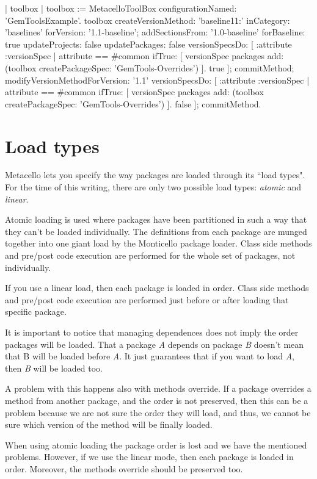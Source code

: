 \documentclass[a4paper,10pt,twoside]{book}
\begin{document}
\begin{code}{}
| toolbox |
toolbox := MetacelloToolBox configurationNamed: 'GemToolsExample'.
toolbox
  createVersionMethod: 'baseline11:' inCategory: 'baselines' forVersion: '1.1-baseline';
  addSectionsFrom: '1.0-baseline'
    forBaseline: true
    updateProjects: false
    updatePackages: false
    versionSpecsDo: [ :attribute :versionSpec |
      attribute == #common
        ifTrue: [ versionSpec packages add: (toolbox createPackageSpec: 'GemTools-Overrides') ].
      true ];
  commitMethod;
  modifyVersionMethodForVersion: '1.1'
    versionSpecsDo: [ :attribute :versionSpec |
      attribute == #common
        ifTrue: [ versionSpec packages add: (toolbox createPackageSpec: 'GemTools-Overrides') ].
      false ];
  commitMethod.
\end{code}


\section{Load types}
Metacello lets you specify the way packages are loaded through its ``load types". For the time of this writing, there are only two possible load types: \emph{atomic} and \emph{linear}. 

Atomic loading is used where packages have been partitioned in such a way that they can't be loaded individually. The definitions from each package are munged together into one giant load by the Monticello package loader. Class side  methods and pre/post code execution are performed for the whole set of packages, not individually. 

If you use a linear load, then each package is loaded in order. Class side  methods and pre/post code execution are performed just before or after loading that specific package.

It is important to notice that managing dependences does not imply the order packages will be loaded. That a package \emph{A} depends on package \emph{B} doesn't mean that B will be loaded before \emph{A}. It just guarantees that if you want to load \emph{A}, then \emph{B} will be loaded too. 

A problem with this happens also with methods override. If a package overrides a method from another package, and the order is not preserved, then this can be a problem because we are not sure the order they will load, and thus, we cannot be sure which version of the method will be finally loaded. 

When using atomic loading the package order is lost and we have the mentioned problems. However, if we use the linear mode, then each package is loaded in order. Moreover, the methods override should be preserved too. 
\end{document}
